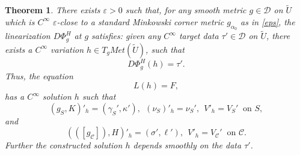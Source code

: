 \documentclass[10pt]{amsart}
\renewcommand{\a}{\alpha}
\newcommand{\g}{\gamma}
\newcommand{\e}{\varepsilon}
\newcommand{\s}{\sigma}
\renewcommand{\k}{\kappa}
\newcommand{\cC}{{\mathcal C}}
\newcommand{\cD}{{\mathcal D}}
\newcommand{\be}{\begin{equation}}
\newcommand{\ee}{\end{equation}}
\newcommand{\<}{\langle}
\renewcommand{\>}{\rangle}
\newcommand{\w}{\widetilde}
\theoremstyle{plain}
\newtheorem{theorem}[lemma]{Theorem}
\theoremstyle{remark}
\theoremstyle{definition}
\numberwithin{equation}{section}
\begin{document}
  
\begin{theorem}\label{locexist}
There exists $\e > 0$ such that, for any smooth metric $g \in \cD$ on $\w U$ which is $C^{\infty}$ $\e$-close to a standard Minkowski corner metric $g_{\a_0}$ 
as in \eqref{eps}, the linearization $D\Phi_g^H$ at $g$ satisfies: given any $C^{\infty}$ target data 
$\tau' \in \cD$ on $\w U$, there exists a $C^{\infty}$ variation $h \in T_g Met(\w U)$, such that 
\be \label{DwPhisol}
D\Phi_g^H(h) = \tau'.
\ee
Thus, the equation 
\be \label{LhF}
L(h) = F,
\ee
has a $C^{\infty}$ solution $h$ such that 
\be \label{IC1}
(g_S, K)'_h = (\g_S', \k'), \ \ (\nu_S)'_h = \nu_S', \ \ V'_h = V_S' \ \mbox{ on }S,
\ee
and
\be \label{BC1}
(([g_\cC]), H)'_h = (\s', \ell'), \ \ V'_h = V_\cC' \ \mbox{ on }\cC.
\ee
Further the constructed solution $h$ depends smoothly on the data $\tau'$. 
\end{theorem}
  
\end{document}
